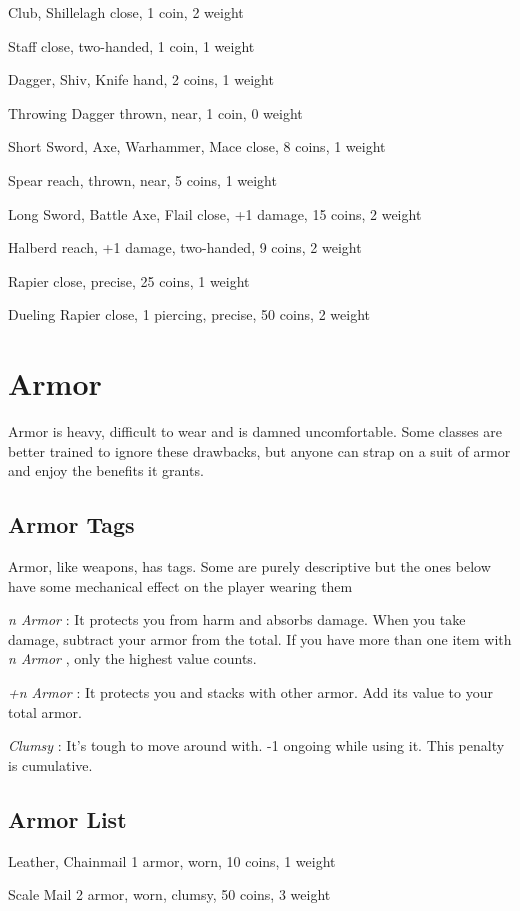  Club, Shillelagh close, 1 coin, 2 weight


 Staff close, two-handed, 1 coin, 1 weight


 Dagger, Shiv, Knife hand, 2 coins, 1 weight


 Throwing Dagger thrown, near, 1 coin, 0 weight


 Short Sword, Axe, Warhammer, Mace close, 8 coins, 1 weight


 Spear reach, thrown, near, 5 coins, 1 weight


 Long Sword, Battle Axe, Flail close, +1 damage, 15 coins, 2 weight


 Halberd reach, +1 damage, two-handed, 9 coins, 2 weight


 Rapier close, precise, 25 coins, 1 weight


 Dueling Rapier close, 1 piercing, precise, 50 coins, 2 weight
\section{Armor}


 Armor is heavy, difficult to wear and is damned uncomfortable. Some classes are better trained to ignore these drawbacks, but anyone can strap on a suit of armor and enjoy the benefits it grants.
\subsection{Armor Tags}


 Armor, like weapons, has tags. Some are purely descriptive but the ones below have some mechanical effect on the player wearing them


 \emph{n Armor}
: It protects you from harm and absorbs damage. When you take damage, subtract your armor from the total. If you have more than one item with \emph{n Armor}
, only the highest value counts. 


 \emph{+n Armor}
: It protects you and stacks with other armor. Add its value to your total armor.


 \emph{Clumsy}
: It's tough to move around with. -1 ongoing while using it. This penalty is cumulative.
\subsection{Armor List}


 Leather, Chainmail 1 armor, worn, 10 coins, 1 weight


 Scale Mail 2 armor, worn, clumsy, 50 coins, 3 weight


